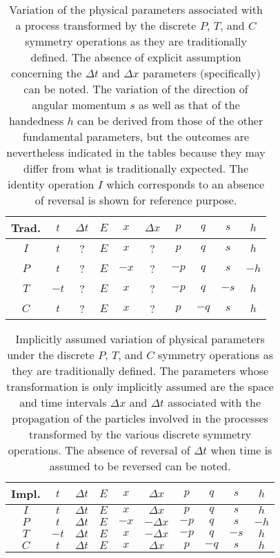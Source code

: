 \documentclass[notitlepage,12pt]{report}
\begin{document}
\begin{table}
\begin{center}
\begin{tabular}{c||c|c|c||c|c|c||c|c|c}
Trad. & $t$  & $\Delta t$  & $E$ & $x$ & $\Delta x$ & $p$ & $q$ & $s$ & $h$ \\  \hline\hline
$I$ & $t$  & ?  & $E$ & $x$ & ? & $p$ & $q$ & $s$ & $h$ \\  \hline
$P$ & $t$  & ?  & $E$ & $-x$ & ? & $-p$ & $q$ & $s$ & $-h$ \\  \hline
$T$ & $-t$ & ?  & $E$ & $x$ & ? & $-p$ & $q$ & $-s$ & $h$  \\  \hline
$C$ & $t$ & ?  & $E$ & $x$ & ? & $p$ & $-q$ & $s$ & $h$  
\end{tabular}
\end{center}
\caption[Variation of the physical parameters associated with a process transformed by the discrete $P$, $T$, and $C$ symmetry operations as they are traditionally defined]{Variation of the physical parameters associated with a process transformed by the discrete $P$, $T$, and $C$ symmetry operations as they are traditionally defined. The absence of explicit assumption concerning the $\Delta t$ and $\Delta x$ parameters (specifically) can be noted. The variation of the direction of angular momentum $s$ as well as that of the handedness $h$ can be derived from those of the other fundamental parameters, but the outcomes are nevertheless indicated in the tables because they may differ from what is traditionally expected. The identity operation $I$ which corresponds to an absence of reversal is shown for reference purpose.
}\label{tab:3.1}
\end{table}

\begin{table}
\begin{center}
\begin{tabular}{c||c|c|c||c|c|c||c|c|c}
Impl. & $t$  & $\Delta t$  & $E$ & $x$ & $\Delta x$ & $p$ & $q$ & $s$ & $h$ \\  \hline\hline
$I$ & $t$  & $\Delta t$  & $E$ & $x$ & $\Delta x$ & $p$ & $q$ & $s$ & $h$ \\  \hline
$P$ & $t$  & $\Delta t$  & $E$ & $-x$ & $-\Delta x$ & $-p$ & $q$ & $s$ & $-h$ \\  \hline
$T$ & $-t$ & $\Delta t$  & $E$ & $x$ & $-\Delta x$ & $-p$ & $q$ & $-s$ & $h$  \\  \hline
$C$ & $t$ & $\Delta t$  & $E$ & $x$ & $\Delta x$ & $p$ & $-q$ & $s$ & $h$  
\end{tabular}
\end{center}
\caption[Implicitly assumed variation of physical parameters under the discrete $P$, $T$, and $C$ symmetry operations as they are traditionally defined]{Implicitly assumed variation of physical parameters under the discrete $P$, $T$, and $C$ symmetry operations as they are traditionally defined. The parameters whose transformation is only implicitly assumed are the space and time intervals $\Delta x$ and $\Delta t$ associated with the propagation of the particles involved in the processes transformed by the various discrete symmetry operations. The absence of reversal of $\Delta t$ when time is assumed to be reversed can be noted.
}\label{tab:3.2}
\end{table}
\end{document}
